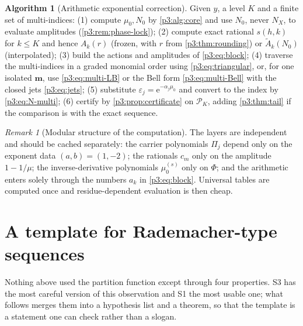 \documentclass[11pt,a4paper,oneside]{book}
\theoremstyle{plain}
\theoremstyle{definition}
\newtheorem{algorithm}[theorem]{Algorithm}
\theoremstyle{remark}
\newtheorem{remark}[theorem]{Remark}
\newcommand{\e}{\mathrm{e}}
\begin{document}
\begin{algorithm}[Arithmetic exponential correction]\label{p3:alg:full}
Given $y$, a level $K$ and a finite set of multi-indices: (1) compute $\mu_{0},N_{0}$ by
\cref{p3:alg:core} and use $N_{0}$, never $N_{X}$, to evaluate amplitudes
(\cref{p3:rem:phase-lock}); (2) compute exact rational $s(h,k)$ for $k\le K$ and hence $A_{k}(r)$
(frozen, with $r$ from \cref{p3:thm:rounding}) or $\widetilde A_{k}(N_{0})$ (interpolated); (3)
build the actions and amplitudes of \cref{p3:eq:block}; (4) traverse the multi-indices in a graded
monomial order using \cref{p3:eq:triangular}, or, for one isolated $\boldsymbol m$, use
\cref{p3:eq:multi-LB} or the Bell form \cref{p3:eq:multi-Bell} with the closed jets
\cref{p3:eq:jets}; (5) substitute $\varepsilon_{j}=\e^{-\alpha_{j}\mu_{0}}$ and convert to the
index by \cref{p3:eq:N-multi}; (6) certify by \cref{p3:prop:certificate} on $\mathcal{P}_{K}$,
adding \cref{p3:thm:tail} if the comparison is with the exact sequence.
\end{algorithm}

\begin{remark}[Modular structure of the computation]\label{p3:rem:reuse}
The layers are independent and should be cached separately: the carrier polynomials $\Pi_{j}$
depend only on the exponent data $(a,b)=(1,-2)$; the rationals $c_{m}$ only on the amplitude
$1-1/\mu$; the inverse-derivative polynomials $\mu_{0}^{(s)}$ only on $\Phi$; and the arithmetic
enters solely through the numbers $a_{k}$ in \cref{p3:eq:block}. Universal tables are computed
once and residue-dependent evaluation is then cheap.
\end{remark}

\section{A template for Rademacher-type sequences}\label{p3:sec:template}

Nothing above used the partition function except through four properties. S3 has the most careful
version of this observation and S1 the most usable one; what follows merges them into a hypothesis
list and a theorem, so that the template is a statement one can check rather than a slogan.
\end{document}
